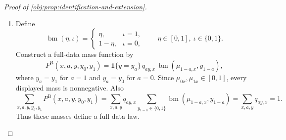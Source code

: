 \begin{proof}[Proof of \cref{obj:prop:identification-and-extension}]
\begin{enumerate}
\[+\operatorname{tot}\left(
\frac{\zeta}{\phi+\zeta}-\frac{\zeta'}{\phi'+\zeta'}
\right),
\]
and
\[
\left|\frac{\zeta}{\phi+\zeta}-\frac{\zeta'}{\phi'+\zeta'}\right|
\le
\frac{|\zeta-\zeta'|+|\phi-\phi'|}{\phi+\zeta},
\]
because
\[
\frac{\zeta}{\phi+\zeta}-\frac{\zeta'}{\phi'+\zeta'}
=
\frac{\phi'(\zeta-\zeta')+\zeta'(\phi'-\phi)}
{(\phi+\zeta)(\phi'+\zeta')}.
\]
Together with \(0\le\zeta'/(\phi'+\zeta')\le1\) and
\(\operatorname{tot}/(\phi+\zeta)\le\epsilon^{-1}\), this gives
\[
|\operatorname{scal}_{\epsilon}-\operatorname{scal}_{\epsilon}'|
\le (1+\epsilon^{-1})\operatorname{dist}_{\mathrm{cell}}.
\]
If one total is zero, nonnegativity forces that quadruple to vanish, and the bound follows from
\(0\le \operatorname{scal}_{\epsilon}\le\operatorname{tot}\) and
\(1\le1+\epsilon^{-1}\).  Applying this estimate to each arm, after merely permuting the four
coordinates, yields
\[
|g_{a,\epsilon}(u)-g_{a,\epsilon}(v)|
\le
(1+\epsilon^{-1})\sum_{\jmath\in\mathcal J}|u_{\jmath}-v_{\jmath}|.
\]
Finally,
\[
|\bar f_\epsilon(u)-\bar f_\epsilon(v)|
\le
\max_{a\in\{0,1\}}|g_{a,\epsilon}(u)-g_{a,\epsilon}(v)|,
\]
which proves the asserted global Lipschitz property. %

\item Define
\[
\operatorname{bm}(\eta,\iota)=
\begin{cases}
\eta, & \iota=1,\\
1-\eta, & \iota=0,
\end{cases}
\qquad \eta\in[0,1],\ \iota\in\{0,1\}.
\]
Construct a full-data mass function by
\[
P^{\mathrm B}(x,a,y,y_0,y_1)
=
\mathbf 1\{y=y_a\}\,
q_{ay,x}\,
\operatorname{bm}(\mu_{1-a,x},y_{1-a}),
\]
where \(y_a=y_1\) for \(a=1\) and \(y_a=y_0\) for \(a=0\).  Since
\(\mu_{0x},\mu_{1x}\in[0,1]\), every displayed mass is nonnegative.  Also
\[
\sum_{x,a,y,y_0,y_1} P^{\mathrm B}(x,a,y,y_0,y_1)
=
\sum_{x,a,y}q_{ay,x}\sum_{y_{1-a}\in\{0,1\}}\operatorname{bm}(\mu_{1-a,x},y_{1-a})
=
\sum_{x,a,y}q_{ay,x}=1.
\]
Thus these masses define a full-data law. %


\end{enumerate}
\end{proof}
